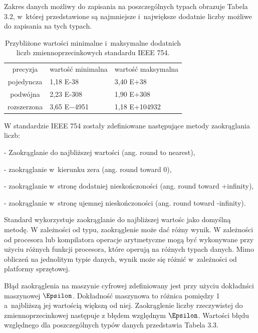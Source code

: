 Zakres danych możliwy do zapisania na poszczególnych typach obrazuje Tabela 3.2, w~której przedstawione są najmniejsze i~największe dodatnie liczby możliwe do zapisania na tych typach.

\begin{table}[h]
        \centering
        \begin{threeparttable}
                \caption{Przybliżone wartości minimalne i~maksymalne dodatnich liczb zmiennoprzecinkowych standardu IEEE 754.}\label{tab:table_exampleazd}
                \begin{tabularx}{0.6\textwidth}{| c | X | X |}
                        \midrule
                        	precyzja	&	wartość minimalna & wartość maksymalna \\
		pojedyncza  & 1,18 E-38 & 3,40 E+38 \\
                        podwójna  & 2,23 E-308 & 1,90 E+308 \\
		rozszerzona &  3,65 E−4951 & 1,18 E+104932 \\
                        \bottomrule
                \end{tabularx}
        \end{threeparttable}
\end{table}

W standardzie IEEE 754 zostały zdefiniowane następujące metody zaokrąglania liczb:

- Zaokrąglanie do najbliższej wartości (ang. round to nearest),

- zaokrąglanie w~kierunku zera (ang. round toward 0),

- zaokrąglanie w~stronę dodatniej nieskończoności (ang. round toward +infinity),

- zaokrąglanie w~stronę ujemnej nieskończoności (ang. round toward -infinity).

Standard wykorzystuje zaokrąglanie do najbliższej wartośc jako domyślną metodę. W zależności od typu, zaokrąglenie może dać różny wynik. W zależności od procesora lub kompilatora operacje arytmetyczne mogą być wykonywane przy użyciu różnych funkcji procesora, które operują na różnych typach danych. Mimo obliczeń na jednolitym typie danych, wynik może się różnić w~zależności od platformy sprzętowej.

Błąd zaokrąglenia na maszynie cyfrowej zdefiniowany jest przy użyciu dokładnści maszynowej $\Epsilon$. Dokładność maszynowa to różnica pomiędzy 1 a~najbliższą jej wartością większą od niej. Zaokrąglenie liczby rzeczywistej do zmiennoprzecinkowej następuje z błędem względnym $\Epsilon$\2. Wartości błędu względnego dla poszczególnych typów danych przedstawia Tabela 3.3. 

